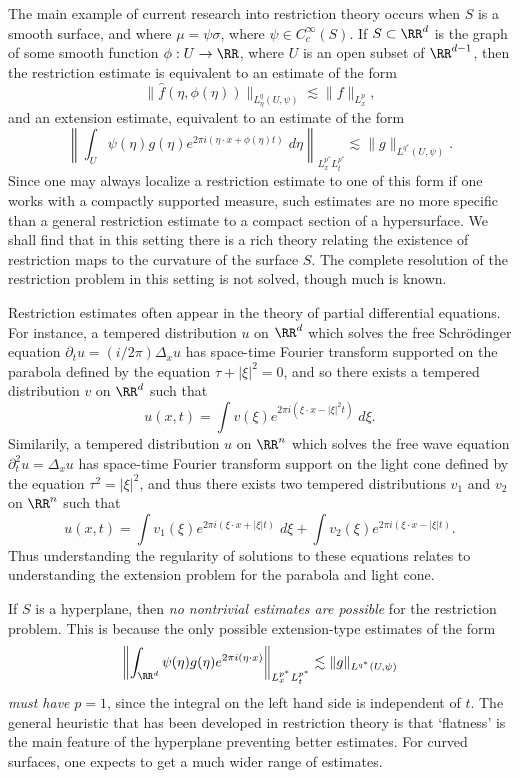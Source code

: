 The main example of current research into restriction theory occurs when $S$ is a smooth surface, and where $\mu = \psi \sigma$, where $\psi \in C_c^\infty(S)$. If $S \subset \RR^d$ is the graph of some smooth function $\phi: U \to \RR$, where $U$ is an open subset of $\RR^{d-1}$, then the restriction estimate is equivalent to an estimate of the form
%
\[ \| \widehat{f}(\eta,\phi(\eta)) \|_{L^q_\eta(U,\psi)} \lesssim \| f \|_{L^p_x}, \]
%
and an extension estimate, equivalent to an estimate of the form
%
\[ \left\| \int_U \psi(\eta) g(\eta) e^{2 \pi i (\eta \cdot x + \phi(\eta) t)}\; d\eta \right\|_{L^{p^*}_x L^{p^*}_t} \lesssim \| g \|_{L^{q^*}(U,\psi)}. \]
%
Since one may always localize a restriction estimate to one of this form if one works with a compactly supported measure, such estimates are no more specific than a general restriction estimate to a compact section of a hypersurface. We shall find that in this setting there is a rich theory relating the existence of restriction maps to the curvature of the surface $S$. The complete resolution of the restriction problem in this setting is not solved, though much is known.

Restriction estimates often appear in the theory of partial differential equations. For instance, a tempered distribution $u$ on $\RR^d$ which solves the free Schr\"{o}dinger equation $\partial_t u = (i / 2 \pi) \Delta_x u$ has space-time Fourier transform supported on the parabola defined by the equation $\tau + |\xi|^2 = 0$, and so there exists a tempered distribution $v$ on $\RR^d$ such that
%
\[ u(x,t) = \int v(\xi) e^{2 \pi i ( \xi \cdot x - |\xi|^2 t )}\; d\xi. \]
%
Similarily, a tempered distribution $u$ on $\RR^n$ which solves the free wave equation $\partial_t^2 u = \Delta_x u$ has space-time Fourier transform support on the light cone defined by the equation $\tau^2 = |\xi|^2$, and thus there exists two tempered distributions $v_1$ and $v_2$ on $\RR^n$ such that
%
\[ u(x,t) = \int v_1(\xi) e^{2 \pi i (\xi \cdot x + |\xi| t )}\; d\xi + \int v_2(\xi) e^{2 \pi i (\xi \cdot x - |\xi| t)}. \]
%
Thus understanding the regularity of solutions to these equations relates to understanding the extension problem for the parabola and light cone.

\begin{example}
    If $S$ is a hyperplane, then \emph{no nontrivial estimates are possible} for the restriction problem. This is because the only possible extension-type estimates of the form
    \[ \left\| \int_{\RR^d} \psi(\eta) g(\eta) e^{2 \pi i (\eta \cdot x)} \right\|_{L^{p^*}_x L^{p^*}_t} \lesssim \| g \|_{L^{q^*}(U,\psi)} \]
    \emph{must have} $p = 1$, since the integral on the left hand side is independent of $t$. The general heuristic that has been developed in restriction theory is that `flatness' is the main feature of the hyperplane preventing better estimates. For curved surfaces, one expects to get a much wider range of estimates.
\end{example}

